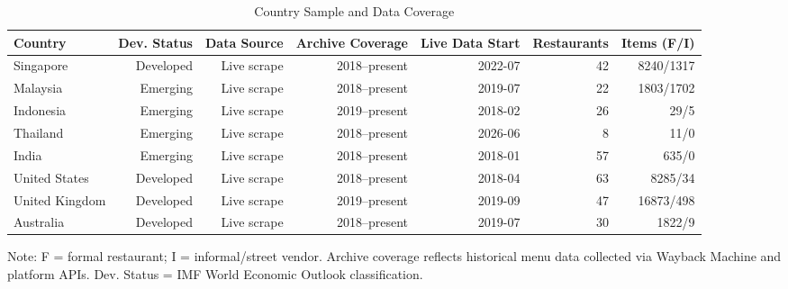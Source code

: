 \begin{table}[htbp]
        \centering
        \caption{Country Sample and Data Coverage}
        \label{tab:sample}
        \begin{tabular}{lrrrrrr}
        \toprule
        \textbf{Country} & \textbf{Dev. Status} & \textbf{Data Source} & \textbf{Archive Coverage} & \textbf{Live Data Start} & \textbf{Restaurants} & \textbf{Items (F/I)} \\
        \midrule
        Singapore & Developed & Live scrape & 2018–present & 2022-07 & 42 & 8240/1317 \\
Malaysia & Emerging & Live scrape & 2018–present & 2019-07 & 22 & 1803/1702 \\
Indonesia & Emerging & Live scrape & 2019–present & 2018-02 & 26 & 29/5 \\
Thailand & Emerging & Live scrape & 2018–present & 2026-06 & 8 & 11/0 \\
India & Emerging & Live scrape & 2018–present & 2018-01 & 57 & 635/0 \\
United States & Developed & Live scrape & 2018–present & 2018-04 & 63 & 8285/34 \\
United Kingdom & Developed & Live scrape & 2019–present & 2019-09 & 47 & 16873/498 \\
Australia & Developed & Live scrape & 2018–present & 2019-07 & 30 & 1822/9 \\
        \bottomrule
        \end{tabular}
        \footnotesize Note: F = formal restaurant; I = informal/street vendor. Archive coverage reflects historical menu data collected via Wayback Machine and platform APIs. Dev. Status = IMF World Economic Outlook classification.
        \end{table}